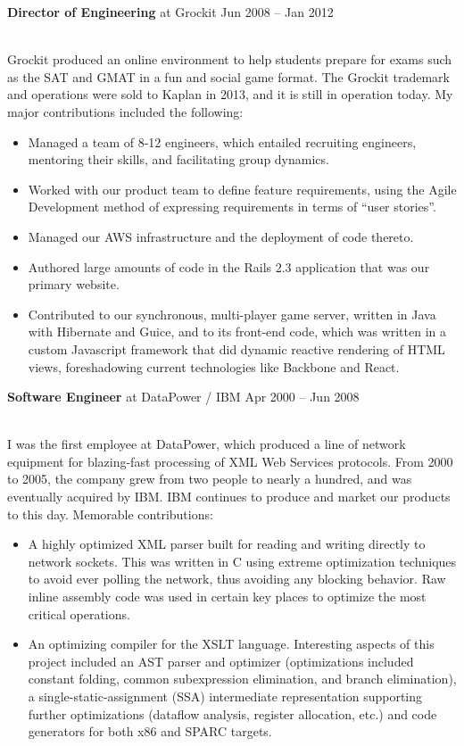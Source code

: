 \documentclass[10pt]{article}
\begin{document}
\headedsection
  {\textbf{Director of Engineering} at Grockit}
  {Jun 2008 -- Jan 2012}
  {\\Grockit produced an online environment to help students prepare for exams such as the SAT
    and GMAT in a fun and social game format.  The Grockit trademark and operations were sold to
    Kaplan in 2013, and it is still in operation today.  My major contributions included the
    following:
   \begin{itemize}
   \item Managed a team of 8-12 engineers, which entailed recruiting engineers, mentoring their
     skills, and facilitating group dynamics.
   \item Worked with our product team to define feature requirements, using the Agile
     Development method of expressing requirements in terms of ``user stories''.
   \item Managed our AWS infrastructure and the deployment of code thereto.
   \item Authored large amounts of code in the Rails 2.3 application that was our primary website.
   \item Contributed to our synchronous, multi-player game server, written in Java with
     Hibernate and Guice, and to its front-end code, which was written in a custom Javascript
     framework that did dynamic reactive rendering of HTML views, foreshadowing current
     technologies like Backbone and React.
   \end{itemize}}

\headedsection
  {\textbf{Software Engineer} at DataPower / IBM}
  {Apr 2000 -- Jun 2008}
  {\\I was the first employee at DataPower, which produced a line of network equipment for
    blazing-fast processing of XML Web Services protocols. From 2000 to 2005, the company grew
    from two people to nearly a hundred, and was eventually acquired by IBM. IBM continues to
    produce and market our products to this day.  Memorable contributions:
   \begin{itemize}
   \item A highly optimized XML parser built for reading and writing directly to network
     sockets. This was written in C using extreme optimization techniques to avoid ever polling
     the network, thus avoiding any blocking behavior.  Raw inline assembly code was used in
     certain key places to optimize the most critical operations.
   \item An optimizing compiler for the XSLT language. Interesting aspects of this project
     included an AST parser and optimizer (optimizations included constant folding, common
     subexpression elimination, and branch elimination), a single-static-assignment (SSA)
     intermediate representation supporting further optimizations (dataflow analysis, register
     allocation, etc.) and code generators for both x86 and SPARC targets.
   \end{itemize}}
\end{document}
